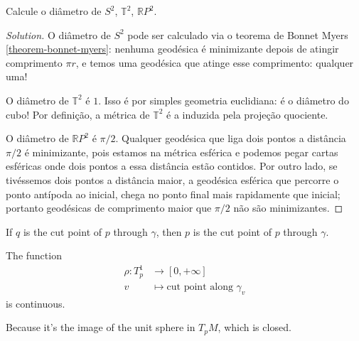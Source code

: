 \begin{exercise}
\label{exercise-diametros}
Calcule o diâmetro de $S^2$, $\mathbb{T}^2$, $\mathbb{R}P^{2}$.
\end{exercise}

\begin{proof}[Solution]
O diâmetro de $S^2$ pode ser calculado via o teorema de Bonnet Myers
\ref{theorem-bonnet-myers}: nenhuma geodésica é minimizante depois de atingir
comprimento $\pi r$, e temos uma geodésica que atinge esse comprimento: qualquer
uma!

O diâmetro de $\mathbb{T}^2$ é $1$. Isso é por simples geometria
euclidiana: é o diâmetro do cubo! Por definição, a métrica de  $\mathbb{T}^2$ é
a induzida pela projeção quociente.

O diâmetro de $\mathbb{R}P^{2}$ é $\pi/2$. Qualquer geodésica que liga dois
pontos a distância $\pi/2$ é minimizante, pois estamos na métrica esférica e
podemos pegar cartas esféricas onde dois pontos a essa distância estão contidos. 
Por outro lado, se tivéssemos dois pontos a distância maior, a geodésica 
esférica que percorre o ponto antípoda ao inicial, chega no ponto final mais 
rapidamente que inicial; portanto geodésicas de comprimento maior que $\pi/2$ 
não são minimizantes.
\end{proof}

\begin{lemma}
\label{lemma-cut-point-reflexive}
If $q$ is the cut point of $p$ through $\gamma$, then $p$ is the cut point of
$p$ through $\gamma$.
\end{lemma}

\begin{lemma}
\label{lemma-not-cut-locus-minimizing}

\end{lemma}

\begin{proposition}
The function
\begin{align*}
	\rho: T^1_p &\longrightarrow [0,+\infty] \\
	v &\longmapsto \text{cut point along }\gamma_v 
\end{align*}
is continuous.
\end{proposition}

\begin{lemma}
\label{lemma-cut-locus-closed}
Because it's the image of the unit sphere in $T_pM$, which is closed.
\end{lemma}

\begin{lemma}
\label{lemma-cut-locus-topology}

\end{lemma}

